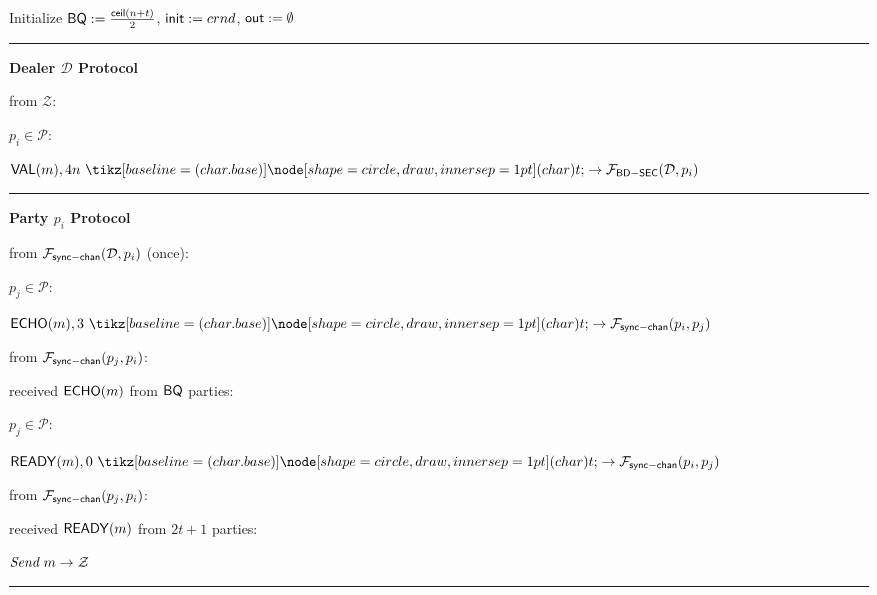 \begin{bbox}[title={$\Pi_{\msf{Bracha}} (\mathcal{D}, \mathcal{P} = p_1,...,p_n)$ in $\F_{\msf{sync-chan}}$-hybrid}]

Initialize ${\mathsf {BQ}} := \frac{{\mathsf {ceil}}(n+t)}{2}$, ${\mathsf {init}} := crnd$, ${\mathsf {out}} := \emptyset$

\vspace{2mm} \hrule \vspace{2mm}

{\bf Dealer $\mathcal{D}$ Protocol}

\OnInput {} from $\mathcal{Z}$:
	\begin{renumerate}
	\item \For $p_i \in \mathcal{P}$:

		\quad  \Send $\msf{VAL}(m),4n \token \rightarrow \Fsync{\mathcal{D}}{p_i}$
	\end{renumerate}

\vspace{2mm} \hrule \vspace{2mm}

{\bf Party $p_i$ Protocol}

\OnInput {} from $\mathcal{F}_{{\mathsf {sync-chan}}}(\mathcal{D},p_i)$ (once):
	\begin{renumerate}
	\item \For $p_j \in \mathcal{P}$: 
	
	\quad \Send $\msf{ECHO}(m), 3 \token \rightarrow \Fchan{p_i}{p_j}$
	\end{renumerate}

\OnInput {} from $\mathcal{F}_{{\mathsf {sync-chan}}}(p_j,p_i)$:
	\begin{renumerate}
	\item \If received ${\mathsf {ECHO}}(m)$ from ${\mathsf {BQ}}$ parties:
		\begin{ritemize}
		\item \For $p_j \in \mathcal{P}$: 
		
		\quad \Send $\msf{READY}(m), 0 \token \rightarrow \Fchan{p_i}{p_j}$ \\
		\end{ritemize}
	\end{renumerate}

\OnInput {} from $\mathcal{F}_{{\mathsf {sync-chan}}}(p_j,p_i)$:
	\begin{renumerate}
	\item \If received ${\mathsf {READY}}(m)$ from $2t+1$ parties:
		\begin{ritemize}
		\item $\emph{Send}~ m \rightarrow \mathcal{Z}$
		\end{ritemize}
	\end{renumerate}

\vspace{2mm} \hrule \vspace{2mm}

\end{bbox}

